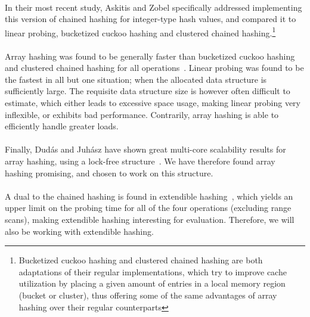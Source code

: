 \documentclass[11pt]{report} %
\begin{document}
\\
In their most recent study, Askitis and Zobel specifically addressed implementing this version of chained hashing for integer-type hash values, and compared it to linear probing, bucketized cuckoo hashing and clustered chained hashing.\footnote{Bucketized cuckoo hashing and clustered chained hashing are both adaptations of their regular implementations, which try to improve cache utilization by placing a given amount of entries in a local memory region (bucket or cluster), thus offering some of the same advantages of array hashing over their regular counterparts} \\
\\
Array hashing was found to be generally faster than bucketized cuckoo hashing and clustered chained hashing for all operations~\cite{NA09}. Linear probing was found to be the fastest in all but one situation; when the allocated data structure is sufficiently large. The requisite data structure size is however often difficult to estimate, which either leads to excessive space usage, making linear probing very inflexible, or exhibits bad performance. Contrarily, array hashing is able to efficiently handle greater loads. \\
\\
Finally, Dudás and Juhász have shown great multi-core scalability results for array hashing, using a lock-free structure~\cite{ADSJ13}. We have therefore found array hashing promising, and chosen to work on this structure. \\
\\
A dual to the chained hashing is found in extendible hashing~\cite{dms03}, which yields an upper limit on the probing time for all of the four operations (excluding range scans), making extendible hashing interesting for evaluation. Therefore, we will also be working with extendible hashing.
\end{document}
